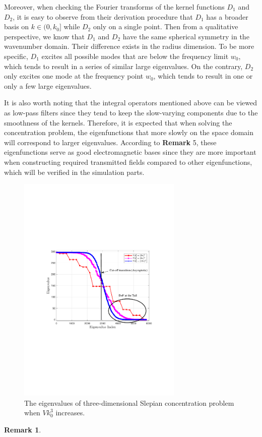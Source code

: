 \documentclass[a4paper,12pt]{article}
\newtheorem{remark}{\bf Remark}
\begin{document}
\begin{framed}
{   \quad Moreover, when checking the Fourier transforms of the kernel functions $D_1$ and $D_2$, it is easy to observe from their derivation procedure that $D_1$ has a broader basis on $k \in (0,k_0]$ while $D_2$ only on a single point. Then from a qualitative perspective, we know that $D_1$ and $D_2$ have the same spherical symmetry in the wavenumber domain. Their difference exists in the radius dimension. To be more specific,
   $D_1$ excites all possible modes that are below the frequency limit $w_0$, which tends to result in a series of similar large eigenvalues. On the contrary, $D_2$ only excites one mode at the frequency point $w_0$, which tends to result in one or only a few large eigenvalues. 
   
   \quad It is also worth noting that the integral operators mentioned above can be viewed as low-pass filters since they tend to keep the slow-varying components due to the smoothness of the kernels. Therefore, it is expected that when solving the concentration problem, the eigenfunctions that more slowly on the space domain will correspond to larger eigenvalues. According to {\bf Remark} 5, these eigenfunctions serve as good electromagnetic bases since they are more important when constructing required transmitted fields compared to other eigenfunctions, which will be verified in the simulation parts.
   }
   
   \setcounter{figure}{2}
     \begin{figure}[H]
   	\centering 
   	\includegraphics[width=0.7\textwidth]{figs/save_3d_different_Vk.pdf} 
   	\caption{\color{red} The eigenvalues of three-dimensional Slepian concentration problem when $V k_0^3$ increases.} 
   	\label{3d_Vk}
   \end{figure}
   {
   \color{red}
   \setcounter{remark}{5} 
   \begin{remark}
   	

\end{remark}}
\end{framed}
\end{document}
